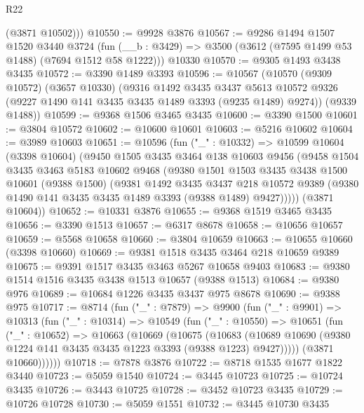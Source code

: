 \begin{lexlean}{R22}
\begin{coremodule}
        (@3871 @10502)))
@10550 := @9928 @3876
@10567 := @9286
    @1494
    @1507
    @1520
    @3440
    @3724
    (fun (__b : @3429) => @3500 (@3612 (@7595 @1499 @53 @1488) (@7694 @1512 @58 @1222)))
    @10330
@10570 := @9305 @1493 @3438 @3435
@10572 := @3390 @1489 @3393
@10596 := @10567
    (@10570
      (@9309 @10572)
      (@3657 @10330)
      (@9316
        @1492
        @3435
        @3437
        @5613
        @10572
        @9326
        (@9227 @1490 @141 @3435 @3435 @1489 @3393 (@9235 @1489) @9274))
      (@9339 @1488))
@10599 := @9368 @1506 @3465 @3435
@10600 := @3390 @1500
@10601 := @3804 @10572
@10602 := @10600 @10601
@10603 := @5216 @10602
@10604 := @3989 @10603
@10651 := @10596
    (fun ("_" : @10332) =>
    @10599
      @10604
      (@3398 @10604)
      (@9450
        @1505
        @3435
        @3464
        @138
        @10603
        @9456
        (@9458
          @1504
          @3435
          @3463
          @5183
          @10602
          @9468
          (@9380
            @1501
            @1503
            @3435
            @3438
            @1500
            @10601
            (@9388 @1500)
            (@9381
              @1492
              @3435
              @3437
              @218
              @10572
              @9389
              (@9380 @1490 @141 @3435 @3435 @1489 @3393 (@9388 @1489) @9427)))))
      (@3871 @10604))
@10652 := @10331 @3876
@10655 := @9368 @1519 @3465 @3435
@10656 := @3390 @1513
@10657 := @6317 @8678
@10658 := @10656 @10657
@10659 := @5568 @10658
@10660 := @3804 @10659
@10663 := @10655 @10660 (@3398 @10660)
@10669 := @9381 @1518 @3435 @3464 @218 @10659 @9389
@10675 := @9391 @1517 @3435 @3463 @5267 @10658 @9403
@10683 := @9380 @1514 @1516 @3435 @3438 @1513 @10657 (@9388 @1513)
@10684 := @9380 @976
@10689 := @10684 @1226 @3435 @3437 @975 @8678
@10690 := @9388 @975
@10717 := @8714
    (fun ("_" : @7879) =>
    @9900
      (fun ("_" : @9901) =>
      @10313
        (fun ("_" : @10314) =>
        @10549
          (fun ("_" : @10550) =>
          @10651
            (fun ("_" : @10652) =>
            @10663
              (@10669
                (@10675
                  (@10683
                    (@10689
                      @10690
                      (@9380 @1224 @141 @3435 @3435 @1223 @3393 (@9388 @1223) @9427)))))
              (@3871 @10660))))))
@10718 := @7878 @3876
@10722 := @8718 @1535 @1677 @1822 @3440
@10723 := @5059 @1540
@10724 := @3445 @10723
@10725 := @10724 @3435
@10726 := @3443 @10725
@10728 := @3452 @10723 @3435
@10729 := @10726 @10728
@10730 := @5059 @1551
@10732 := @3445 @10730 @3435

\end{coremodule}
\end{lexlean}

